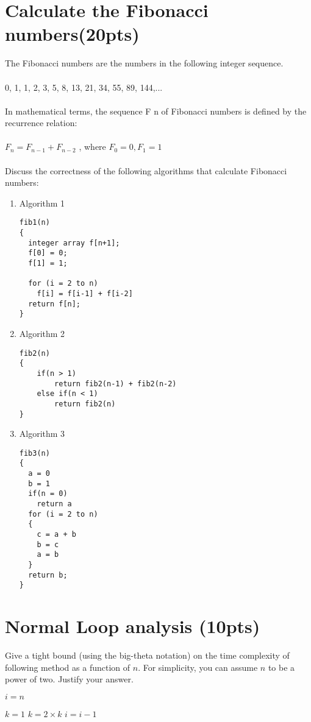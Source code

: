\documentclass{article}[12pt]
\begin{document}
\section{Calculate the Fibonacci numbers(20pts)}
The Fibonacci numbers are the numbers in the following integer sequence. \\ \\
0, 1, 1, 2, 3, 5, 8, 13, 21, 34, 55, 89, 144,... \\ \\
In mathematical terms, the sequence F n of Fibonacci numbers is defined by the recurrence relation: \\ \\
$F_n = F_{n-1} + F_{n-2}$ , where $F_0 = 0,F_1 = 1$ \\ \\
Discuss the correctness of the following algorithms that calculate Fibonacci numbers:
\begin{enumerate}
\item {Algorithm 1}
\begin{lstlisting}
fib1(n)
{
  integer array f[n+1];
  f[0] = 0;
  f[1] = 1;

  for (i = 2 to n)
    f[i] = f[i-1] + f[i-2]
  return f[n];
}
\end{lstlisting}
\item {Algorithm 2}
\begin{lstlisting}
fib2(n)
{
    if(n > 1)
        return fib2(n-1) + fib2(n-2)
    else if(n < 1)
        return fib2(n)
}
\end{lstlisting}
\item {Algorithm 3}
\begin{lstlisting}
fib3(n)
{
  a = 0 
  b = 1
  if(n = 0)
    return a
  for (i = 2 to n)
  {
	c = a + b
	b = c
	a = b
  }
  return b;
}
\end{lstlisting}
\end{enumerate}

\section{Normal Loop analysis (10pts)}

Give a tight bound (using the big-theta notation) on the time complexity of following method as a function of $n$. For simplicity, you can assume $n$ to be a power of two. Justify your answer.

\hfill \break

\begin{algorithmic}
\State $i = n$

        \State $k = 1$
            \State $k = 2 \times k$
        \EndWhile
    \EndFor
    \State $i = i - 1$
\EndWhile
\EndFunction
\end{algorithmic}
\end{document}
